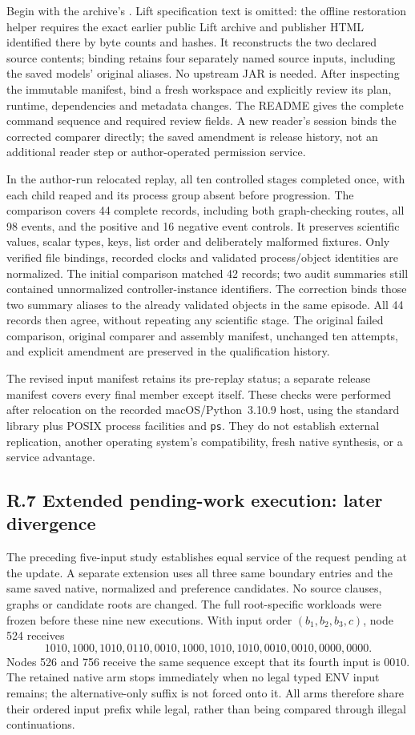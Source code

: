 Begin with the archive's . Lift specification text is
omitted: the offline restoration helper requires the exact earlier public
Lift archive and publisher HTML identified there by byte counts and hashes.
It reconstructs the two declared source contents; binding retains four
separately named source inputs, including the saved models' original
aliases. No upstream JAR is needed. After inspecting the immutable
manifest, bind a fresh workspace and explicitly review its plan, runtime,
dependencies and metadata changes. The README gives the complete command
sequence and required review fields. A new reader's session binds the
corrected comparer directly; the saved amendment is release history,
not an additional reader step or author-operated permission service.

In the author-run relocated replay, all ten controlled stages completed
once, with each child reaped and its process group absent before
progression. The comparison covers 44 complete records, including both
graph-checking routes, all 98 events, and the positive and 16 negative
event controls. It preserves scientific values, scalar types, keys,
list order and deliberately malformed fixtures. Only verified file
bindings, recorded clocks and validated process/object identities are
normalized. The initial comparison matched 42 records; two audit
summaries still contained unnormalized controller-instance identifiers.
The correction binds those two summary aliases to the already validated
objects in the same episode. All 44 records then agree, without repeating
any scientific stage. The original failed comparison, original comparer
and assembly manifest, unchanged ten attempts, and explicit amendment
are preserved in the qualification history.

The revised input manifest retains its pre-replay status; a separate
release manifest covers every final member except itself. These checks
were performed after relocation on the recorded macOS/Python~3.10.9 host,
using the standard library plus POSIX process facilities and
\texttt{ps}. They do not establish external replication, another operating
system's compatibility, fresh native synthesis, or a service advantage.

\subsection*{R.7 Extended pending-work execution: later divergence}
The preceding five-input study establishes equal service of the request
pending at the update. A separate extension uses all three same boundary
entries and the same saved native, normalized and preference candidates.
No source clauses, graphs or candidate roots are changed. The full
root-specific workloads were frozen before these nine new executions.
With input order $(b_1,b_2,b_3,c)$, node 524 receives
\[
1010,1000,1010,0110,0010,1000,1010,1010,0010,0010,0000,0000.
\]
Nodes 526 and 756 receive the same sequence except that its fourth input
is $0010$. The retained native arm stops immediately when no legal typed
ENV input remains; the alternative-only suffix is not forced onto it.
All arms therefore share their ordered input prefix while legal, rather
than being compared through illegal continuations.

